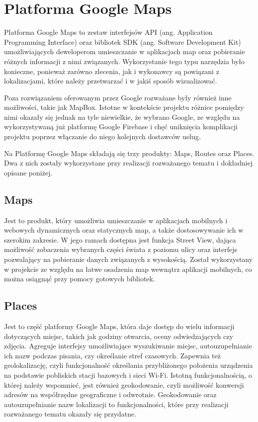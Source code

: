 \section{Platforma Google Maps}
Platforma Google Maps to zestaw interfejsów API (ang. Application Programming Interface) oraz bibliotek SDK (ang. Software Development Kit) umożliwiających deweloperom umieszczanie w aplikacjach map oraz pobieranie różnych informacji z nimi związanych. Wykorzystanie tego typu narzędzia było konieczne, ponieważ zarówno zlecenia, jak i wykonawcy są powiązani z lokalizacjami, które należy przetwarzać i w jakiś sposób wizualizować. 

Poza rozwiązaniem oferowanym przez Google rozważane były również inne możliwości, takie jak MapBox. Istotne w kontekście projektu różnice pomiędzy nimi okazały się jednak na tyle niewielkie, że wybrano Google, ze względu na wykorzystywaną już platformę Google Firebase i chęć uniknięcia komplikacji projektu poprzez włączanie do niego kolejnych dostawców usług.

Na Platformę Google Maps składają się trzy produkty: Maps, Routes oraz Places. Dwa z nich zostały wykorzystane przy realizacji rozważanego tematu i dokładniej opisane poniżej. 


\subsection{Maps}
Jest to produkt, który umożliwia umieszczanie w aplikacjach mobilnych i webowych dynamicznych oraz statycznych map, a także dostosowywanie ich w szerokim zakresie. W jego ramach dostępna jest funkcja Street View, dająca możliwość zobaczenia wybranych części świata z poziomu ulicy oraz interfejs pozwalający na pobieranie danych związanych z wysokością. Został wykorzystany w projekcie ze względu na łatwe osadzenia map wewnątrz aplikacji mobilnych, co można osiągnąć przy pomocy gotowych bibliotek.

\subsection{Places}
Jest to część platformy Google Maps, która daje dostęp do wielu informacji dotyczących miejsc, takich jak godziny otwarcia, oceny odwiedzających czy zdjęcia. Agreguje interfejsy umożliwiające wyszukiwanie miejsc, autouzupełnianie ich nazw podczas pisania, czy określanie stref czasowych. Zapewnia też geolokalizację, czyli funkcjonalność określania przybliżonego położenia urządzenia na podstawie pobliskich stacji bazowych i sieci Wi-Fi. Istotną funkcjonalnością, o której należy wspomnieć, jest również geokodowanie, czyli możliwość konwersji adresów na współrzędne geograficzne i odwrotnie. Geokodowanie oraz autouzupełnianie nazw lokalizacji to funkcjonalności, które przy realizacji rozważanego tematu okazały się przydatne.

